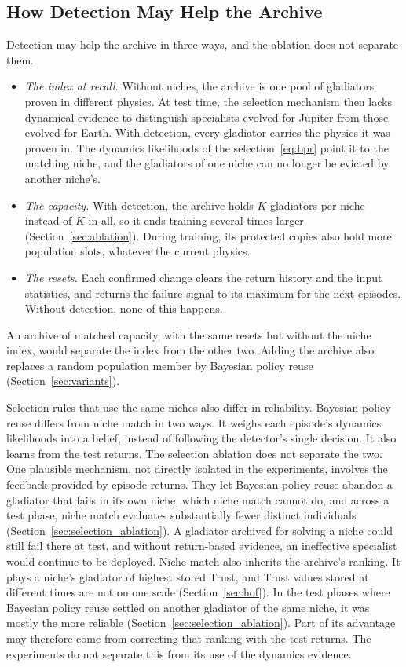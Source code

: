 \subsection{How Detection May Help the Archive}
Detection may help the archive in three ways, and the ablation does not separate them.
\begin{itemize}
\item \textit{The index at recall.} Without niches, the archive is one pool of gladiators proven in different physics. At test time, the selection mechanism then lacks dynamical evidence to distinguish specialists evolved for Jupiter from those evolved for Earth. With detection, every gladiator carries the physics it was proven in. The dynamics likelihoods of the selection~\eqref{eq:bpr} point it to the matching niche, and the gladiators of one niche can no longer be evicted by another niche's.
\item \textit{The capacity.} With detection, the archive holds $K$ gladiators per niche instead of $K$ in all, so it ends training several times larger (Section~\ref{sec:ablation}). During training, its protected copies also hold more population slots, whatever the current physics.
\item \textit{The resets.} Each confirmed change clears the return history and the input statistics, and returns the failure signal to its maximum for the next episodes. Without detection, none of this happens.
\end{itemize}
An archive of matched capacity, with the same resets but without the niche index, would separate the index from the other two. Adding the archive also replaces a random population member by Bayesian policy reuse (Section~\ref{sec:variants}).

Selection rules that use the same niches also differ in reliability. Bayesian policy reuse differs from niche match in two ways. It weighs each episode's dynamics likelihoods into a belief, instead of following the detector's single decision. It also learns from the test returns. The selection ablation does not separate the two. One plausible mechanism, not directly isolated in the experiments, involves the feedback provided by episode returns. They let Bayesian policy reuse abandon a gladiator that fails in its own niche, which niche match cannot do, and across a test phase, niche match evaluates substantially fewer distinct individuals (Section~\ref{sec:selection_ablation}). A gladiator archived for solving a niche could still fail there at test, and without return-based evidence, an ineffective specialist would continue to be deployed. Niche match also inherits the archive's ranking. It plays a niche's gladiator of highest stored Trust, and Trust values stored at different times are not on one scale (Section~\ref{sec:hof}). In the test phases where Bayesian policy reuse settled on another gladiator of the same niche, it was mostly the more reliable (Section~\ref{sec:selection_ablation}). Part of its advantage may therefore come from correcting that ranking with the test returns. The experiments do not separate this from its use of the dynamics evidence.

